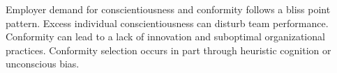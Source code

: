 \documentclass[review]{elsarticle}
\begin{document}


Employer demand for conscientiousness and conformity follows a bliss point pattern.
Excess individual conscientiousness can disturb team performance\cite{curcseu2019personality}.
Conformity can lead to a lack of innovation and suboptimal organizational practices\cite{symon2006neglected}.
Conformity selection occurs in part through heuristic cognition or unconscious bias.


\end{document}
